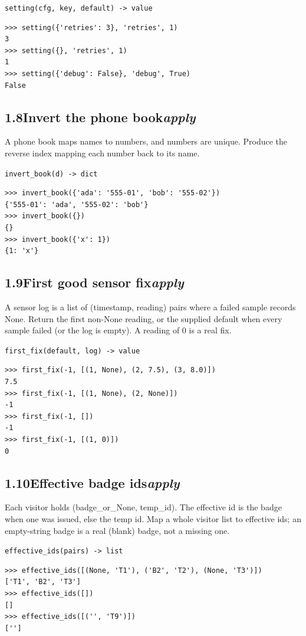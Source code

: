 \documentclass[10pt,letterpaper]{book}
\begin{document}
\noindent\texttt{setting(cfg, key, default) -> value}
\begin{lstlisting}[style=ex]
>>> setting({'retries': 3}, 'retries', 1)
3
>>> setting({}, 'retries', 1)
1
>>> setting({'debug': False}, 'debug', True)
False
\end{lstlisting}
\subsection*{1.8\quad Invert the phone book\hfill\textnormal{\textit{apply}}}
A phone book maps names to numbers, and numbers are unique. Produce the reverse index mapping each number back to its name.

\noindent\texttt{invert\_book(d) -> dict}
\begin{lstlisting}[style=ex]
>>> invert_book({'ada': '555-01', 'bob': '555-02'})
{'555-01': 'ada', '555-02': 'bob'}
>>> invert_book({})
{}
>>> invert_book({'x': 1})
{1: 'x'}
\end{lstlisting}
\subsection*{1.9\quad First good sensor fix\hfill\textnormal{\textit{apply}}}
A sensor log is a list of (timestamp, reading) pairs where a failed sample records None. Return the first non-None reading, or the supplied default when every sample failed (or the log is empty). A reading of 0 is a real fix.

\noindent\texttt{first\_fix(default, log) -> value}
\begin{lstlisting}[style=ex]
>>> first_fix(-1, [(1, None), (2, 7.5), (3, 8.0)])
7.5
>>> first_fix(-1, [(1, None), (2, None)])
-1
>>> first_fix(-1, [])
-1
>>> first_fix(-1, [(1, 0)])
0
\end{lstlisting}

\subsection*{1.10\quad Effective badge ids\hfill\textnormal{\textit{apply}}}
Each visitor holds (badge\_or\_None, temp\_id). The effective id is the badge when one was issued, else the temp id. Map a whole visitor list to effective ids; an empty-string badge is a real (blank) badge, not a missing one.

\noindent\texttt{effective\_ids(pairs) -> list}
\begin{lstlisting}[style=ex]
>>> effective_ids([(None, 'T1'), ('B2', 'T2'), (None, 'T3')])
['T1', 'B2', 'T3']
>>> effective_ids([])
[]
>>> effective_ids([('', 'T9')])
['']
\end{lstlisting}
\end{document}
